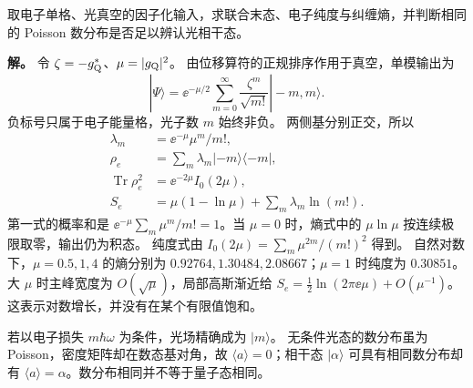 \begin{exbox}
取电子单格、光真空的因子化输入，求联合末态、电子纯度与纠缠熵，并判断相同的 Poisson 数分布是否足以辨认光相干态。

\textbf{解。} 令 $\zeta=-g_{\rm Q}^*$、$\mu=|g_{\rm Q}|^2$。
由位移算符的正规排序作用于真空，单模输出为
\begin{equation}
|\Psi\rangle=\ee^{-\mu/2}\sum_{m=0}^\infty
\frac{\zeta^m}{\sqrt{m!}}|-m,m\rangle.
\label{eq:feqo-vacuum-joint-state}
\end{equation}
负标号只属于电子能量格，光子数 $m$ 始终非负。
两侧基分别正交，所以
\begin{align}
\lambda_m&=\ee^{-\mu}\mu^m/m!,\label{eq:feqo-vacuum-schmidt}\\
\rho_e&=\sum_m\lambda_m|-m\rangle\langle-m|,
\label{eq:feqo-vacuum-reduced-electron}\\
\operatorname{Tr}\rho_e^2&=\ee^{-2\mu}I_0(2\mu),
\label{eq:feqo-vacuum-purity}\\
S_e&=\mu(1-\ln\mu)+\sum_m\lambda_m\ln(m!).
\label{eq:feqo-vacuum-entropy}
\end{align}
第一式的概率和是 $\ee^{-\mu}\sum_m\mu^m/m!=1$。当 $\mu=0$ 时，熵式中的 $\mu\ln\mu$ 按连续极限取零，输出仍为积态。
纯度式由 $I_0(2\mu)=\sum_m\mu^{2m}/(m!)^2$ 得到。
自然对数下，$\mu=0.5,1,4$ 的熵分别为
$0.92764,1.30484,2.08667$；$\mu=1$ 时纯度为 $0.30851$。
大 $\mu$ 时主峰宽度为 $O(\sqrt\mu)$，局部高斯渐近给
$S_e=\tfrac12\ln(2\pi\ee\mu)+O(\mu^{-1})$。
这表示对数增长，并没有在某个有限值饱和。

若以电子损失 $m\hbar\omega$ 为条件，光场精确成为 $|m\rangle$。
无条件光态的数分布虽为 Poisson，密度矩阵却在数态基对角，故
$\langle a\rangle=0$；相干态 $|\alpha\rangle$ 可具有相同数分布却有
$\langle a\rangle=\alpha$。数分布相同并不等于量子态相同。
\end{exbox}


